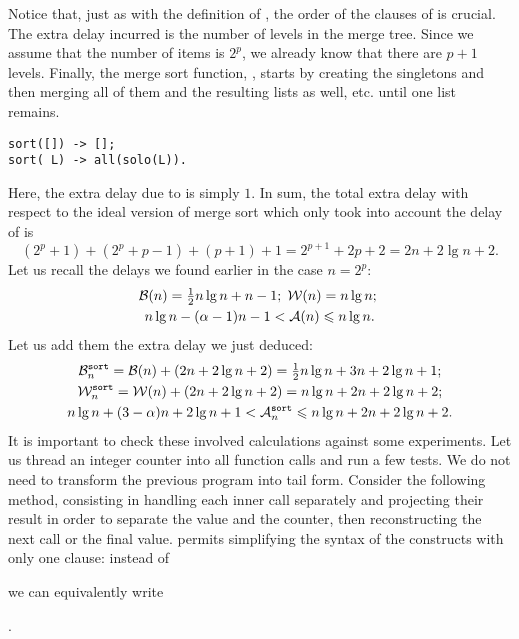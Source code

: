 Notice that, just as with the definition of , the
order of the clauses of  is crucial. The extra delay
incurred is the number of levels in the merge tree. Since we assume
that the number of items is \(2^p\), we already know that there are
\(p+1\) levels. Finally, the merge sort function, ,
starts by creating the singletons and then merging all of them and the
resulting lists as well, etc. until one list remains.
\begin{verbatim}
sort([]) -> [];
sort( L) -> all(solo(L)).
\end{verbatim}
Here, the extra delay due to  is simply \(1\). In sum,
the total extra delay with respect to the ideal version of merge sort
which only took into account the delay of  is
\[
(2^p + 1) + (2^p + p - 1) + (p+1) + 1 = 2^{p+1} + 2p + 2 
= 2n + 2\lg n + 2.
\]
Let us recall the delays we found earlier in the case \(n=2^p\):
\begin{gather*}
\Bideal(n) = \tfrac{1}{2}{n\lg n} + n - 1;\;
\Wideal(n) = n\lg n;\;\\
n\lg n - (\alpha - 1)n - 1 < \Aideal(n) \leqslant n\lg n.
\end{gather*}
Let us add them the extra delay we just deduced:
\begin{gather*}
\best{sort}{n}  = \Bideal(n) + (2n + 2\lg n + 2)
                = \tfrac{1}{2}{n\lg n} + 3n + 2\lg n + 1;\\
\worst{sort}{n} = \Wideal(n) + (2n + 2\lg n + 2)
                = n\lg n + 2n + 2\lg n + 2;\\
n\lg n + (3-\alpha)n + 2\lg n + 1
< \ave{sort}{n} \leqslant n\lg n + 2n + 2\lg n + 2.
\end{gather*}
It is important to check these involved calculations against some
experiments. Let us thread an integer counter into all function calls
and run a few tests. We do not need to transform the previous program
into tail form. Consider the following method, consisting in handling
each inner call separately and projecting their result in order to
separate the value and the counter, then reconstructing the next call
or the final value.   \Erlang permits
simplifying the syntax of the  constructs with only one
clause: instead of
\begin{center}
\end{center}
we can equivalently write
\begin{center}
.
\end{center}
